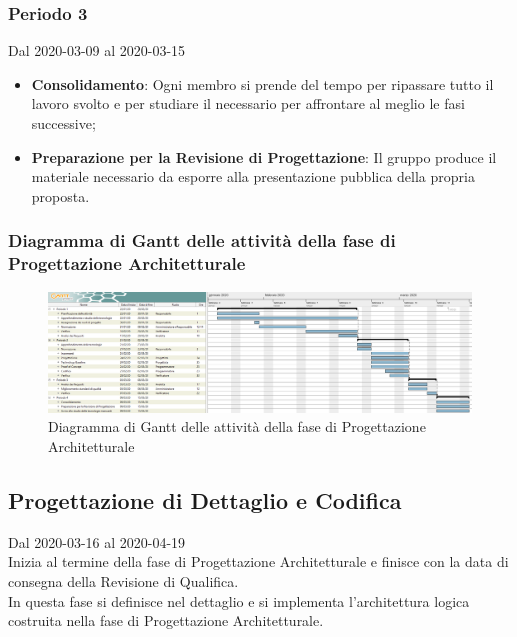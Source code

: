 \subsubsection{Periodo 3} 
Dal 2020-03-09 al 2020-03-15
\begin{itemize}
	\item \textbf{Consolidamento}: Ogni membro si prende del tempo per ripassare tutto il lavoro svolto e per studiare il necessario per affrontare al meglio le fasi successive;
	\item \textbf{Preparazione per la Revisione di Progettazione}: Il gruppo produce il materiale necessario da esporre alla presentazione pubblica della propria proposta.
\end{itemize}


\newpage
\begin{landscape}
\subsubsection{Diagramma di Gantt delle attività della fase di Progettazione Architetturale}
\pagestyle{empty}
\begin{figure}[h]
	\centering
	\includegraphics[scale=1.48]{Sezioni/DiagrammiGantt/ProgettazioneArchitetturale.png}
	\caption{Diagramma di Gantt delle attività della fase di Progettazione Architetturale}	
\end{figure}
\end{landscape}

\subsection{Progettazione di Dettaglio e Codifica}
Dal 2020-03-16 al 2020-04-19\\
Inizia al termine della fase di Progettazione Architetturale e finisce con la data di consegna della Revisione di Qualifica.\\
In questa fase si definisce nel dettaglio e si implementa l'architettura logica costruita nella fase di Progettazione Architetturale.


